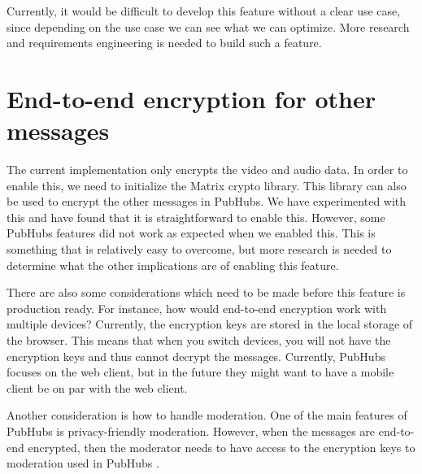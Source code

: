 \documentclass{report}
\begin{document}
Currently, it would be difficult to develop this feature without a clear use case, since depending on the use case we can
see what we can optimize. More research and requirements engineering is needed to build such a feature.

\section{End-to-end encryption for other messages}\label{sec:encryption_of_messages}
The current implementation only encrypts the video and audio data. In order to enable this, we need to initialize the
Matrix crypto library. This library can also be used to encrypt the other messages in PubHubs. We have experimented
with this and have found that it is straightforward to enable this. However, some PubHubs features did not work as expected
when we enabled this. This is something that is relatively easy to overcome, but more research is needed to determine
what the other implications are of enabling this feature.

There are also some considerations which need to be made before this feature is production ready.
For instance, how would end-to-end encryption work with multiple devices? Currently, the encryption keys are stored in
the local storage of the browser. This means that when you switch devices, you will not have the encryption keys and
thus cannot decrypt the messages. Currently, PubHubs focuses on the web client, but in the future they might want to
have a mobile client be on par with the web client.

Another consideration is how to handle moderation. One of the main features of PubHubs is privacy-friendly moderation.
However, when the messages are end-to-end encrypted, then the moderator needs to have access to the encryption keys to
moderation used in PubHubs \cite{noauthor_group_nodate}.

\newpage


\end{document}
